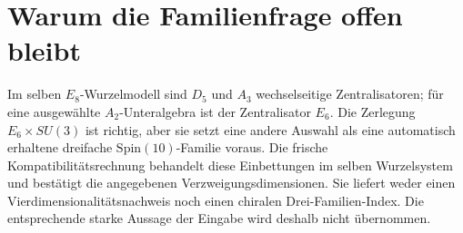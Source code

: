 \section{Warum die Familienfrage offen bleibt}
Im selben $E_8$-Wurzelmodell sind $D_5$ und $A_3$ wechselseitige Zentralisatoren; für eine ausgewählte $A_2$-Unteralgebra ist der Zentralisator $E_6$. Die Zerlegung $E_6\times SU(3)$ ist richtig, aber sie setzt eine andere Auswahl als eine automatisch erhaltene dreifache $\mathrm{Spin}(10)$-Familie voraus. Die frische Kompatibilitätsrechnung behandelt diese Einbettungen im selben Wurzelsystem und bestätigt die angegebenen Verzweigungsdimensionen. Sie liefert weder einen Vierdimensionalitätsnachweis noch einen chiralen Drei-Familien-Index. Die entsprechende starke Aussage der Eingabe wird deshalb nicht übernommen.

